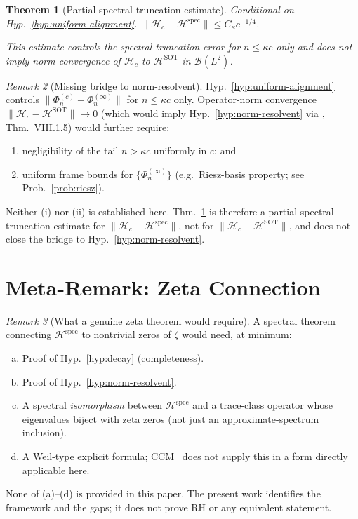 \documentclass[12pt,a4paper]{amsart}
\newtheorem{theorem}{Theorem}[section]
\theoremstyle{definition}
\theoremstyle{remark}
\newtheorem{remark}[theorem]{Remark}
\newcommand{\Hc}{\mathcal{H}_c}
\newcommand{\Hspec}{\mathcal{H}^{\mathrm{spec}}}
\newcommand{\HSOT}{\mathcal{H}^{\mathrm{SOT}}}
\begin{document}
\begin{theorem}[Partial spectral truncation estimate]
\label{thm:opnorm}
\emph{Conditional on Hyp.~\ref{hyp:uniform-alignment}.}
$\|\Hc-\Hspec\|\le C_\kappa c^{-1/4}$.

\noindent
This estimate controls the spectral truncation error
for $n\le\kappa c$ only and does \emph{not} imply
norm convergence of $\Hc$ to $\HSOT$
in $\mathcal{B}(L^2)$.
\end{theorem}

\begin{remark}[Missing bridge to norm-resolvent]
\label{rem:opnorm-bridge}
Hyp.~\ref{hyp:uniform-alignment} controls
$\|\Phi_n^{(c)}-\Phi_n^{(\infty)}\|$
for $n\le\kappa c$ only.
Operator-norm convergence $\|\Hc-\HSOT\|\to 0$
(which would imply Hyp.~\ref{hyp:norm-resolvent}
via \cite{Kato1966}, Thm.~VIII.1.5)
would further require:
\begin{enumerate}[\rm(i)]
\item negligibility of the tail $n>\kappa c$
  uniformly in $c$; and
\item uniform frame bounds for $\{\Phi_n^{(\infty)}\}$
  (e.g.\ Riesz-basis property;
  see Prob.~\ref{prob:riesz}).
\end{enumerate}
Neither (i) nor (ii) is established here.
Thm.~\ref{thm:opnorm} is therefore a partial
spectral truncation estimate for $\|\Hc-\Hspec\|$,
not for $\|\Hc-\HSOT\|$,
and does not close the bridge to
Hyp.~\ref{hyp:norm-resolvent}.
\end{remark}

\section{Meta-Remark: Zeta Connection}
\label{sec:rh-remark}

\begin{remark}[What a genuine zeta theorem would require]
\label{rem:rh-meta}
A spectral theorem connecting $\Hspec$ to
nontrivial zeros of $\zeta$ would need, at minimum:
\begin{enumerate}[(a)]
\item Proof of Hyp.~\ref{hyp:decay} (completeness).
\item Proof of Hyp.~\ref{hyp:norm-resolvent}.
\item A spectral \emph{isomorphism} between
  $\Hspec$ and a trace-class operator whose
  eigenvalues biject with zeta zeros (not just
  an approximate-spectrum inclusion).
\item A Weil-type explicit formula;
  CCM~\cite{CCM2025} does not supply this in a
  form directly applicable here.
\end{enumerate}
None of (a)--(d) is provided in this paper.
The present work identifies the framework and the gaps;
it does not prove RH or any equivalent statement.
\end{remark}
\end{document}
